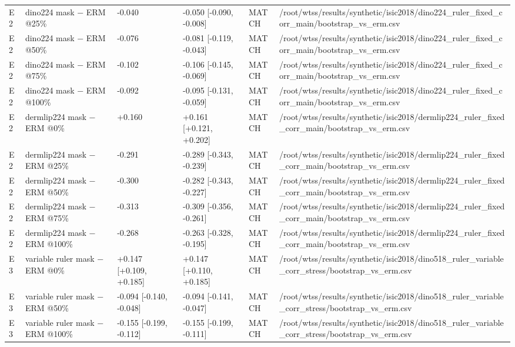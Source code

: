 {{\begin{longtable}[]{@{}llllll@{}}
E2 & dino224 mask − ERM @25\% & -0.040 & -0.050 {[}-0.090, -0.008{]} & MATCH & /root/wtss/results/synthetic/isic2018/dino224\_ruler\_fixed\_corr\_main/bootstrap\_vs\_erm.csv \\
E2 & dino224 mask − ERM @50\% & -0.076 & -0.081 {[}-0.119, -0.043{]} & MATCH & /root/wtss/results/synthetic/isic2018/dino224\_ruler\_fixed\_corr\_main/bootstrap\_vs\_erm.csv \\
E2 & dino224 mask − ERM @75\% & -0.102 & -0.106 {[}-0.145, -0.069{]} & MATCH & /root/wtss/results/synthetic/isic2018/dino224\_ruler\_fixed\_corr\_main/bootstrap\_vs\_erm.csv \\
E2 & dino224 mask − ERM @100\% & -0.092 & -0.095 {[}-0.131, -0.059{]} & MATCH & /root/wtss/results/synthetic/isic2018/dino224\_ruler\_fixed\_corr\_main/bootstrap\_vs\_erm.csv \\
E2 & dermlip224 mask − ERM @0\% & +0.160 & +0.161 {[}+0.121, +0.202{]} & MATCH & /root/wtss/results/synthetic/isic2018/dermlip224\_ruler\_fixed\_corr\_main/bootstrap\_vs\_erm.csv \\
E2 & dermlip224 mask − ERM @25\% & -0.291 & -0.289 {[}-0.343, -0.239{]} & MATCH & /root/wtss/results/synthetic/isic2018/dermlip224\_ruler\_fixed\_corr\_main/bootstrap\_vs\_erm.csv \\
E2 & dermlip224 mask − ERM @50\% & -0.300 & -0.282 {[}-0.343, -0.227{]} & MATCH & /root/wtss/results/synthetic/isic2018/dermlip224\_ruler\_fixed\_corr\_main/bootstrap\_vs\_erm.csv \\
E2 & dermlip224 mask − ERM @75\% & -0.313 & -0.309 {[}-0.356, -0.261{]} & MATCH & /root/wtss/results/synthetic/isic2018/dermlip224\_ruler\_fixed\_corr\_main/bootstrap\_vs\_erm.csv \\
E2 & dermlip224 mask − ERM @100\% & -0.268 & -0.263 {[}-0.328, -0.195{]} & MATCH & /root/wtss/results/synthetic/isic2018/dermlip224\_ruler\_fixed\_corr\_main/bootstrap\_vs\_erm.csv \\
E3 & variable ruler mask − ERM @0\% & +0.147 {[}+0.109, +0.185{]} & +0.147 {[}+0.110, +0.185{]} & MATCH & /root/wtss/results/synthetic/isic2018/dino518\_ruler\_variable\_corr\_stress/bootstrap\_vs\_erm.csv \\
E3 & variable ruler mask − ERM @50\% & -0.094 {[}-0.140, -0.048{]} & -0.094 {[}-0.141, -0.047{]} & MATCH & /root/wtss/results/synthetic/isic2018/dino518\_ruler\_variable\_corr\_stress/bootstrap\_vs\_erm.csv \\
E3 & variable ruler mask − ERM @100\% & -0.155 {[}-0.199, -0.112{]} & -0.155 {[}-0.199, -0.111{]} & MATCH & /root/wtss/results/synthetic/isic2018/dino518\_ruler\_variable\_corr\_stress/bootstrap\_vs\_erm.csv \\

\end{longtable}}}
